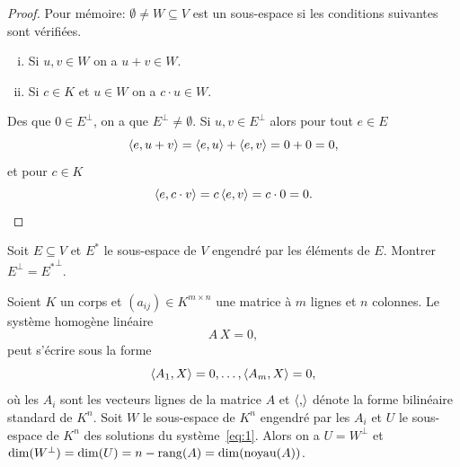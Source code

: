 \begin{proof}
  Pour mémoire: $\emptyset \neq W\subseteq V$ est un sous-espace si les conditions suivantes sont vérifiées. 
  \begin{enumerate}[i)]
  \item Si $u,v \in W$ on a $u+v \in W$.  
  \item Si $c \in K$ et $u \in W$ on a $c \cdot u \in W$. 
  \end{enumerate}
  
  \noindent
  Des que $0 ∈ E^\perp  $, on a que $E^\perp≠ ∅$.  %
  Si $u,v \in E^\perp$ alors pour tout $e \in E$ 
  \begin{displaymath}
    \langle {e,u+v} \rangle = \langle {e,u} \rangle + \langle {e,v} \rangle = 0 + 0 = 0,
  \end{displaymath}  
  et pour $c \in K$ 
  \begin{displaymath}
    \langle {e,c\cdot v} \rangle = c \,\langle {e,v} \rangle = c \cdot 0 = 0. 
  \end{displaymath}
\end{proof}



\begin{exercise}
  \label{exe:1}
  Soit $E \subseteq V$ et $E^*$ le sous-espace de $V$ engendré par les éléments de $E$. Montrer $E^\perp = {E^*}^\perp$. 
\end{exercise}


\begin{example}
  \label{exe:2}
  Soient $K$ un corps et $(a_{ij}) \in K^{m\times n}$ une matrice à $m$ lignes et $n$ colonnes. Le système homogène linéaire 
  \begin{equation}
    \label{eq:1}
    A\,X = 0,
  \end{equation}
  peut s'écrire sous la forme 
  \begin{displaymath}
    \langle {A_1,X} \rangle=0, \dots ,\langle {A_m,X} \rangle=0, 
  \end{displaymath}
  où les $A_i$  sont les vecteurs lignes de la matrice $A$ et $\langle {,} \rangle$ dénote la forme bilinéaire standard de $K^n$. Soit $W$ le sous-espace de $K^n$ engendré par les $A_i$ et $U$ le sous-espace de $K^n$ des solutions du système~\eqref{eq:1}. Alors on a  $U = W^\perp$ et $\dim(W^\perp) = \dim(U) = n - \operatorname{rang}(A) = \dim(\operatorname{noyau}(A))$. 
  
 \end{example}




